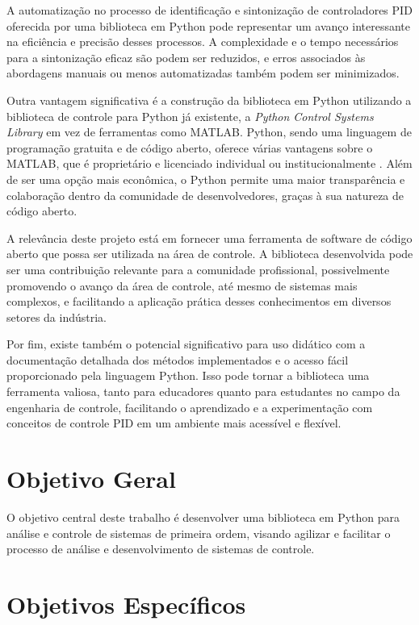 A automatização no processo de identificação e sintonização de controladores PID oferecida por uma biblioteca em Python
pode representar um avanço interessante na eficiência e precisão desses processos.
A complexidade e o tempo necessários para a sintonização eficaz são podem ser reduzidos, e erros
associados às abordagens manuais ou menos automatizadas também podem ser minimizados.

Outra vantagem significativa é a construção da biblioteca em Python utilizando a biblioteca de
controle para Python já existente, a \textit{Python Control Systems Library} em vez de ferramentas como MATLAB.
Python, sendo uma linguagem de programação gratuita e de código aberto, oferece várias vantagens sobre o MATLAB, que é
proprietário e licenciado individual ou institucionalmente \cite{introart3}.
Além de ser uma opção mais econômica, o Python permite uma maior transparência e colaboração dentro da comunidade de
desenvolvedores, graças à sua natureza de código aberto.

A relevância deste projeto está em fornecer uma ferramenta de software de código aberto que possa ser utilizada na área
de controle.
A biblioteca desenvolvida pode ser uma contribuição relevante para a comunidade profissional, possivelmente promovendo
o avanço da área de controle, até mesmo de sistemas mais complexos, e facilitando a aplicação prática desses
conhecimentos em diversos setores da indústria.

Por fim, existe também o potencial significativo para uso didático com a documentação detalhada dos métodos
implementados e o acesso fácil proporcionado pela linguagem Python.
Isso pode tornar a biblioteca uma ferramenta valiosa, tanto para educadores quanto para estudantes no campo da
engenharia de controle, facilitando o aprendizado e a experimentação com conceitos de controle PID em um ambiente mais
acessível e flexível.

\section{Objetivo Geral}\label{sec:objg}

O objetivo central deste trabalho é desenvolver uma biblioteca em Python para análise
e controle de sistemas de primeira ordem, visando agilizar e facilitar o processo de
análise e desenvolvimento de sistemas de controle.

\section{Objetivos Específicos}\label{sec:objs}

